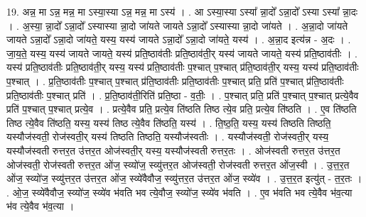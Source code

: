 \documentclass[17pt]{extarticle}
\begin{document}
19. अन्न॒ मा ऽन्न॒ मन्न॒ मा ऽस्या॒स्या ऽन्न॒ मन्न॒ मा ऽस्य॑ । . आ ऽस्या॒स्या ऽस्या᳚ न्ना॒दो᳚ ऽन्ना॒दो᳚ ऽस्या ऽस्या᳚ न्ना॒दः । . अ॒स्या॒ न्ना॒दो᳚ ऽन्ना॒दो᳚ ऽस्यास्या न्ना॒दो जा॑यते जायते ऽन्ना॒दो᳚ ऽस्यास्या न्ना॒दो जा॑यते । . अ॒न्ना॒दो जा॑यते जायते ऽन्ना॒दो᳚ ऽन्ना॒दो जा॑यते॒ यस्य॒ यस्य॑ जायते ऽन्ना॒दो᳚ ऽन्ना॒दो जा॑यते॒ यस्य॑ । . अ॒न्ना॒द इत्य॑न्न - अ॒दः । . जा॒य॒ते॒ यस्य॒ यस्य॑ जायते जायते॒ यस्य॑ प्रति॒ष्ठाव॑तीः प्रति॒ष्ठाव॑ती॒र् यस्य॑ जायते जायते॒ यस्य॑ प्रति॒ष्ठाव॑तीः । . यस्य॑ प्रति॒ष्ठाव॑तीः प्रति॒ष्ठाव॑ती॒र् यस्य॒ यस्य॑ प्रति॒ष्ठाव॑तीः प॒श्चात् प॒श्चात् प्र॑ति॒ष्ठाव॑ती॒र् यस्य॒ यस्य॑ प्रति॒ष्ठाव॑तीः प॒श्चात् । . प्र॒ति॒ष्ठाव॑तीः प॒श्चात् प॒श्चात् प्र॑ति॒ष्ठाव॑तीः प्रति॒ष्ठाव॑तीः प॒श्चात् प्रति॒ प्रति॑ प॒श्चात् प्र॑ति॒ष्ठाव॑तीः प्रति॒ष्ठाव॑तीः प॒श्चात् प्रति॑ । . प्र॒ति॒ष्ठाव॑ती॒रिति॑ प्रति॒ष्ठा - व॒तीः॒ । . प॒श्चात् प्रति॒ प्रति॑ प॒श्चात् प॒श्चात् प्रत्ये॒वैव प्रति॑ प॒श्चात् प॒श्चात् प्रत्ये॒व । . प्रत्ये॒वैव प्रति॒ प्रत्ये॒व ति॑ष्ठति तिष्ठ त्ये॒व प्रति॒ प्रत्ये॒व ति॑ष्ठति । . ए॒व ति॑ष्ठति तिष्ठ त्ये॒वैव ति॑ष्ठति॒ यस्य॒ यस्य॑ तिष्ठ त्ये॒वैव ति॑ष्ठति॒ यस्य॑ । . ति॒ष्ठ॒ति॒ यस्य॒ यस्य॑ तिष्ठति तिष्ठति॒ यस्यौज॑स्वती॒ रोज॑स्वती॒र् यस्य॑ तिष्ठति तिष्ठति॒ यस्यौज॑स्वतीः । . यस्यौज॑स्वती॒ रोज॑स्वती॒र् यस्य॒ यस्यौज॑स्वती रुत्तर॒त उ॑त्तर॒त ओज॑स्वती॒र् यस्य॒ यस्यौज॑स्वती रुत्तर॒तः । . ओज॑स्वती रुत्तर॒त उ॑त्तर॒त ओज॑स्वती॒ रोज॑स्वती रुत्तर॒त ओ॑ज॒ स्व्यो॑ज॒ स्व्यु॑त्तर॒त ओज॑स्वती॒ रोज॑स्वती रुत्तर॒त ओ॑ज॒स्वी । . उ॒त्त॒र॒त ओ॑ज॒ स्व्यो॑ज॒ स्व्यु॑त्तर॒त उ॑त्तर॒त ओ॑ज॒ स्व्ये॑वैवौज॒ स्व्यु॑त्तर॒त उ॑त्तर॒त ओ॑ज॒ स्व्ये॑व । . उ॒त्त॒र॒त इत्यु॑त् - त॒र॒तः । . ओ॒ज॒ स्व्ये॑वैवौज॒ स्व्यो॑ज॒ स्व्ये॑व भ॑वति भव त्ये॒वौज॒ स्व्यो॑ज॒ स्व्ये॑व भ॑वति । . ए॒व भ॑वति भव त्ये॒वैव भ॑व॒त्या भ॑व त्ये॒वैव भ॑व॒त्या । \newline
\end{document}
